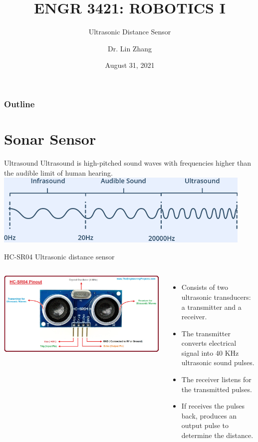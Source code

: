\documentclass[12pt,letterpaper]{beamer}
\title[Robotics I]
{ENGR 3421: ROBOTICS I}
\subtitle{Ultrasonic Distance Sensor}
\author[Zhang, Lin]
{Dr. Lin Zhang}
\institute[UCA] %
{
  Department of Physics and Astronomy\\
  University of Central Arkansas
}
\date[Robotics1 2021] %
{August 31, 2021}
\begin{document}
\frame{\titlepage}

\begin{frame}
\frametitle{Outline}
\tableofcontents
\end{frame}


\section{Sonar Sensor}

\begin{frame}{Ultrasound}
    Ultrasound is high-pitched sound waves with frequencies higher than the audible limit of human hearing.
    {\centering
        \includegraphics[width=0.8\linewidth]{ultrasound_frequency}
    }
\end{frame}

\begin{frame}{HC-SR04 Ultrasonic distance sensor}
    \begin{columns}
        \includegraphics[width=1.1\linewidth]{HC-SR04}

        {\scriptsize
            \begin{itemize} 
                \item Consists of two ultrasonic transducers: a transmitter and a receiver. 
                \item The transmitter converts electrical signal into 40 KHz ultrasonic sound pulses. 
                \item The receiver listens for the transmitted pulses. 
                \item If receives the pulses back, produces an output pulse to determine the distance. 
            \end{itemize} 
        }
    \end{columns}
\end{frame}
\end{document}
